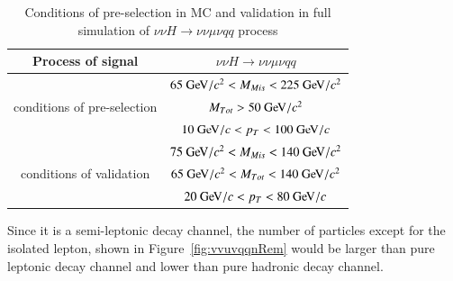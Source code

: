 \documentclass[11pt,a4paper]{cepcnote}
\begin{document}
\begin{table}[H]
  \begin{center}
  \begin{tabular}{|c|c|}
  \hline \hline
  Process of signal								&		$\nu\nu H \to \nu\nu \mu \nu qq$\\
  \hline
  \multirow{3}{*}{conditions of pre-selection}	&	$65\gev/c^2 < M_{Mis} < 225\gev/c^2$	\\
  												&	$M_{Tot} > 50\gev/c^2$\\
												&	$10\gev/c < p_{T} < 100\gev/c$	\\
  \hline
  \multirow{3}{*}{conditions of validation}		&	$75\gev/c^2 < M_{Mis} < 140\gev/c^2$	\\
  												&	$65\gev/c^2 < M_{Tot} < 140\gev/c^2$	\\
												&	$20\gev/c < p_{T} < 80\gev/c$	\\
  \hline \hline
  \end{tabular}
  \caption[]{Conditions of pre-selection in MC and validation in full simulation of $\nu\nu H \to \nu\nu \mu \nu qq$ process}
 \end{center}
  \label{tab:nnhuvqqprecut}
\end{table}

Since it is a semi-leptonic decay channel, the number of particles except for the isolated lepton, shown in 
Figure~\ref{fig:vvuvqqnRem} 
would be larger than pure leptonic decay channel and lower than pure hadronic decay channel. 
\end{document}
